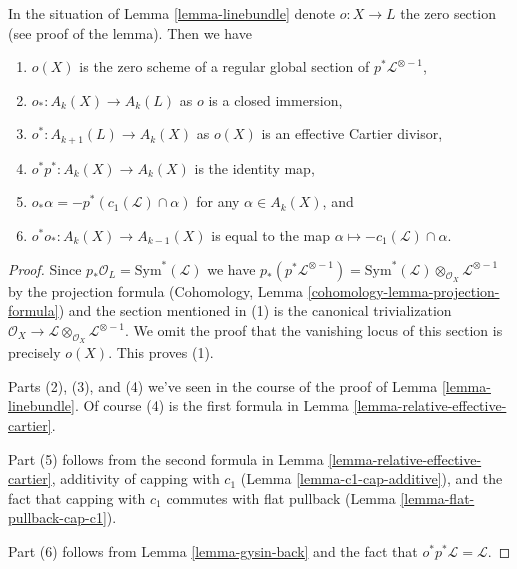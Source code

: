 \begin{lemma}
\label{lemma-linebundle-formulae}
In the situation of Lemma \ref{lemma-linebundle} denote $o : X \to L$
the zero section (see proof of the lemma). Then we have
\begin{enumerate}
\item $o(X)$ is the zero scheme of a regular global section of
$p^*\mathcal{L}^{\otimes -1}$,
\item $o_* : A_k(X) \to A_k(L)$ as $o$ is a closed immersion,
\item $o^* : A_{k + 1}(L) \to A_k(X)$ as $o(X)$
is an effective Cartier divisor,
\item $o^* p^* : A_k(X) \to A_k(X)$ is the identity map,
\item $o_*\alpha = - p^*(c_1(\mathcal{L}) \cap \alpha)$ for any
$\alpha \in A_k(X)$, and
\item $o^* o_* : A_k(X) \to A_{k - 1}(X)$ is equal to the map
$\alpha \mapsto - c_1(\mathcal{L}) \cap \alpha$.
\end{enumerate}
\end{lemma}

\begin{proof}
Since $p_*\mathcal{O}_L = \text{Sym}^*(\mathcal{L})$ we have
$p_*(p^*\mathcal{L}^{\otimes -1}) =
\text{Sym}^*(\mathcal{L}) \otimes_{\mathcal{O}_X} \mathcal{L}^{\otimes -1}$
by the projection formula
(Cohomology, Lemma \ref{cohomology-lemma-projection-formula})
and the section mentioned in (1) is
the canonical trivialization $\mathcal{O}_X \to
\mathcal{L} \otimes_{\mathcal{O}_X} \mathcal{L}^{\otimes -1}$.
We omit the proof that the vanishing locus of
this section is precisely $o(X)$. This proves (1).

\medskip\noindent
Parts (2), (3), and (4) we've seen in the course of the proof of
Lemma \ref{lemma-linebundle}. Of course (4) is the first
formula in Lemma \ref{lemma-relative-effective-cartier}.

\medskip\noindent
Part (5) follows from the second formula in
Lemma \ref{lemma-relative-effective-cartier},
additivity of capping with $c_1$ (Lemma \ref{lemma-c1-cap-additive}),
and the fact that capping with $c_1$ commutes with flat pullback
(Lemma \ref{lemma-flat-pullback-cap-c1}).

\medskip\noindent
Part (6) follows from Lemma \ref{lemma-gysin-back}
and the fact that $o^*p^*\mathcal{L} = \mathcal{L}$.
\end{proof}

